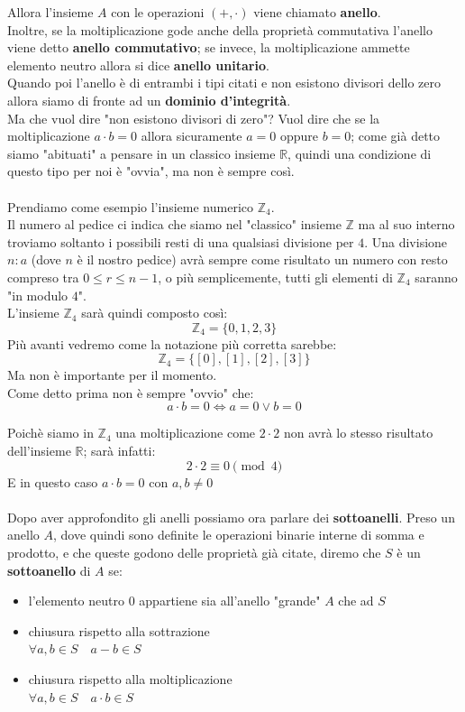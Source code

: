 \documentclass[11pt]{article}
\begin{document}
Allora l'insieme \(A\) con le operazioni \( (+, \cdot) \) viene chiamato \textbf{anello}.\\
Inoltre, se la moltiplicazione gode anche della proprietà commutativa l'anello viene detto 
\textbf{anello commutativo}; se invece, la moltiplicazione ammette elemento neutro allora si dice
\textbf{anello unitario}. \\
Quando poi l'anello è di entrambi i tipi citati e non esistono divisori 
dello zero allora siamo di fronte
ad un \textbf{dominio d'integrità}. \\ 
Ma che vuol dire "non esistono divisori di zero"?
Vuol dire che se la moltiplicazione \(a \cdot b = 0\) allora sicuramente \(a = 0\) oppure \(b = 0\);
come già detto siamo "abituati" a pensare in un classico insieme \(\mathbb{R}\), quindi
una condizione di questo tipo per noi è "ovvia", ma non è sempre così.
\\
\\
Prendiamo come esempio l'insieme numerico \(\mathbb{Z}_4\). \\
Il numero al pedice ci indica che siamo nel "classico" insieme \(\mathbb{Z}\) 
ma al suo interno troviamo soltanto i possibili resti di una qualsiasi divisione per \(4\).
Una divisione \(n : a\) (dove \(n\) è il nostro pedice) avrà sempre come risultato un numero con resto compreso tra 
\(0 \le r \le n - 1\), o più semplicemente, tutti gli elementi di \(\mathbb{Z}_4\)
saranno "in modulo \(4\)". \\
L'insieme \(\mathbb{Z}_4\) sarà quindi composto così:
\[ \mathbb{Z}_4 = \{ 0, 1, 2, 3\} \]
Più avanti vedremo come la notazione più corretta sarebbe:
\[ \mathbb{Z}_4 = \{ [0], [1], [2], [3]\} \]
Ma non è importante per il momento. \\
Come detto prima non è sempre "ovvio" che: 
\[ a \cdot b = 0 \iff a = 0 \lor b = 0\]

Poichè siamo in \(\mathbb{Z}_4\) una moltiplicazione come
\(2 \cdot 2\) non avrà lo stesso risultato dell'insieme \(\mathbb{R}\); 
sarà infatti:
\[ 2 \cdot 2 \equiv 0 \pmod{4}\]
E in questo caso \(a \cdot b = 0\) con \(a, b \neq 0\)
\\
\\
Dopo aver approfondito gli anelli possiamo ora parlare dei \textbf{sottoanelli}.
Preso un anello \(A\), dove quindi sono definite le operazioni binarie interne 
di somma e prodotto, e che queste godono delle proprietà già citate, diremo che 
\(S\) è un \textbf{sottoanello} di \(A\) se:

\begin{itemize}
  \item l'elemento neutro \(0\) appartiene sia all'anello "grande" \(A\)
  che ad \(S\)

  \item chiusura rispetto alla sottrazione \\
  \( \forall a,b \in S \quad a - b \in S \)

  \item chiusura rispetto alla moltiplicazione \\
  \( \forall a,b \in S \quad a \cdot b \in S \)
\end{itemize}
\end{document}
